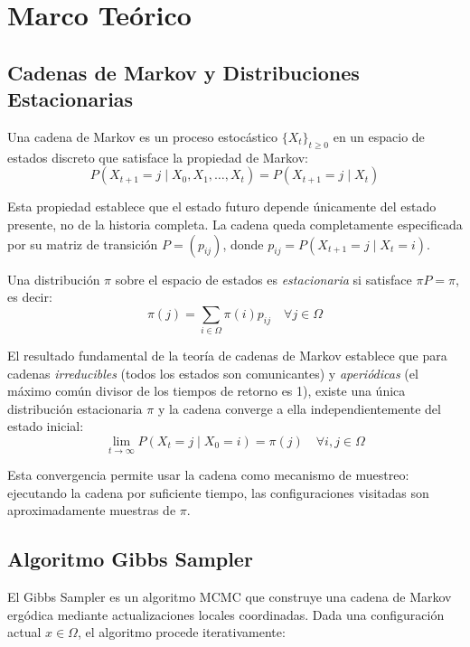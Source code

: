 \clearpage
\section{Marco Teórico}

\subsection{Cadenas de Markov y Distribuciones Estacionarias}

Una cadena de Markov es un proceso estocástico $\{X_t\}_{t\geq 0}$ en un espacio de estados discreto que satisface la propiedad de Markov:
\begin{equation}
P(X_{t+1} = j \mid X_0, X_1, \ldots, X_t) = P(X_{t+1} = j \mid X_t)
\end{equation}

Esta propiedad establece que el estado futuro depende únicamente del estado presente, no de la historia completa. La cadena queda completamente especificada por su matriz de transición $P = (p_{ij})$, donde $p_{ij} = P(X_{t+1} = j \mid X_t = i)$.

Una distribución $\pi$ sobre el espacio de estados es \textit{estacionaria} si satisface $\pi P = \pi$, es decir:
\begin{equation}
\pi(j) = \sum_{i \in \Omega} \pi(i) p_{ij} \quad \forall j \in \Omega
\end{equation}

El resultado fundamental de la teoría de cadenas de Markov establece que para cadenas \textit{irreducibles} (todos los estados son comunicantes) y \textit{aperiódicas} (el máximo común divisor de los tiempos de retorno es 1), existe una única distribución estacionaria $\pi$ y la cadena converge a ella independientemente del estado inicial:
\begin{equation}
\lim_{t \to \infty} P(X_t = j \mid X_0 = i) = \pi(j) \quad \forall i, j \in \Omega
\end{equation}

Esta convergencia permite usar la cadena como mecanismo de muestreo: ejecutando la cadena por suficiente tiempo, las configuraciones visitadas son aproximadamente muestras de $\pi$.

\subsection{Algoritmo Gibbs Sampler}

El Gibbs Sampler es un algoritmo MCMC que construye una cadena de Markov ergódica mediante actualizaciones locales coordinadas. Dada una configuración actual $x \in \Omega$, el algoritmo procede iterativamente:

